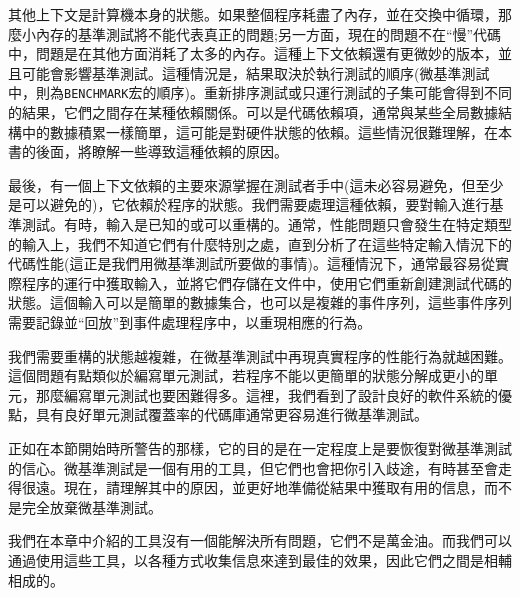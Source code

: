 其他上下文是計算機本身的狀態。如果整個程序耗盡了內存，並在交換中循環，那麼小內存的基準測試將不能代表真正的問題;另一方面，現在的問題不在“慢”代碼中，問題是在其他方面消耗了太多的內存。這種上下文依賴還有更微妙的版本，並且可能會影響基準測試。這種情況是，結果取決於執行測試的順序(微基準測試中，則為\texttt{BENCHMARK}宏的順序)。重新排序測試或只運行測試的子集可能會得到不同的結果，它們之間存在某種依賴關係。可以是代碼依賴項，通常與某些全局數據結構中的數據積累一樣簡單，這可能是對硬件狀態的依賴。這些情況很難理解，在本書的後面，將瞭解一些導致這種依賴的原因。

最後，有一個上下文依賴的主要來源掌握在測試者手中(這未必容易避免，但至少是可以避免的)，它依賴於程序的狀態。我們需要處理這種依賴，要對輸入進行基準測試。有時，輸入是已知的或可以重構的。通常，性能問題只會發生在特定類型的輸入上，我們不知道它們有什麼特別之處，直到分析了在這些特定輸入情況下的代碼性能(這正是我們用微基準測試所要做的事情)。這種情況下，通常最容易從實際程序的運行中獲取輸入，並將它們存儲在文件中，使用它們重新創建測試代碼的狀態。這個輸入可以是簡單的數據集合，也可以是複雜的事件序列，這些事件序列需要記錄並“回放”到事件處理程序中，以重現相應的行為。

我們需要重構的狀態越複雜，在微基準測試中再現真實程序的性能行為就越困難。這個問題有點類似於編寫單元測試，若程序不能以更簡單的狀態分解成更小的單元，那麼編寫單元測試也要困難得多。這裡，我們看到了設計良好的軟件系統的優點，具有良好單元測試覆蓋率的代碼庫通常更容易進行微基準測試。

正如在本節開始時所警告的那樣，它的目的是在一定程度上是要恢復對微基準測試的信心。微基準測試是一個有用的工具，但它們也會把你引入歧途，有時甚至會走得很遠。現在，請理解其中的原因，並更好地準備從結果中獲取有用的信息，而不是完全放棄微基準測試。

我們在本章中介紹的工具沒有一個能解決所有問題，它們不是萬金油。而我們可以通過使用這些工具，以各種方式收集信息來達到最佳的效果，因此它們之間是相輔相成的。






